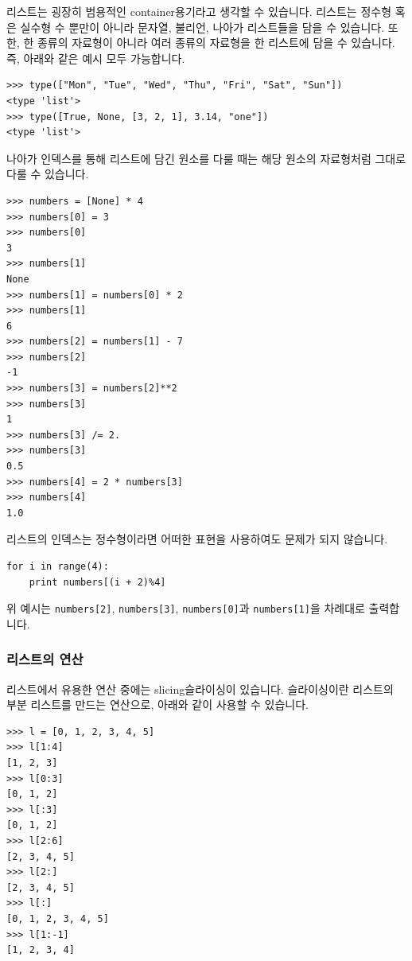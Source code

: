 \documentclass[../main.tex]{subfiles}
\begin{document}
리스트는 굉장히 범용적인 container용기라고 생각할 수 있습니다.
리스트는 정수형 혹은 실수형 수 뿐만이 아니라 문자열, 불리언, 나아가 리스트들을 담을 수 있습니다.
또한, 한 종류의 자료형이 아니라 여러 종류의 자료형을 한 리스트에 담을 수 있습니다.
즉, 아래와 같은 예시 모두 가능합니다.
\begin{verbatim}
>>> type(["Mon", "Tue", "Wed", "Thu", "Fri", "Sat", "Sun"])
<type 'list'>
>>> type([True, None, [3, 2, 1], 3.14, "one"])
<type 'list'>
\end{verbatim}
나아가 인덱스를 통해 리스트에 담긴 원소를 다룰 때는 해당 원소의 자료형처럼 그대로 다룰 수 있습니다.
\begin{verbatim}
>>> numbers = [None] * 4
>>> numbers[0] = 3
>>> numbers[0]
3
>>> numbers[1]
None
>>> numbers[1] = numbers[0] * 2
>>> numbers[1]
6
>>> numbers[2] = numbers[1] - 7
>>> numbers[2]
-1
>>> numbers[3] = numbers[2]**2
>>> numbers[3]
1
>>> numbers[3] /= 2.
>>> numbers[3]
0.5
>>> numbers[4] = 2 * numbers[3]
>>> numbers[4]
1.0
\end{verbatim}

리스트의 인덱스는 정수형이라면 어떠한 표현을 사용하여도 문제가 되지 않습니다.
\begin{verbatim}
for i in range(4):
    print numbers[(i + 2)%4]
\end{verbatim}
위 예시는 \texttt{numbers[2]}, \texttt{numbers[3]}, \texttt{numbers[0]}과 \texttt{numbers[1]}을 차례대로 출력합니다.

\subsubsection{리스트의 연산}
리스트에서 유용한 연산 중에는 slicing슬라이싱이 있습니다.
슬라이싱이란 리스트의 부분 리스트를 만드는 연산으로, 아래와 같이 사용할 수 있습니다.
\begin{verbatim}
>>> l = [0, 1, 2, 3, 4, 5]
>>> l[1:4]
[1, 2, 3]
>>> l[0:3]
[0, 1, 2]
>>> l[:3]
[0, 1, 2]
>>> l[2:6]
[2, 3, 4, 5]
>>> l[2:]
[2, 3, 4, 5]
>>> l[:]
[0, 1, 2, 3, 4, 5]
>>> l[1:-1]
[1, 2, 3, 4]
\end{verbatim}
\end{document}
